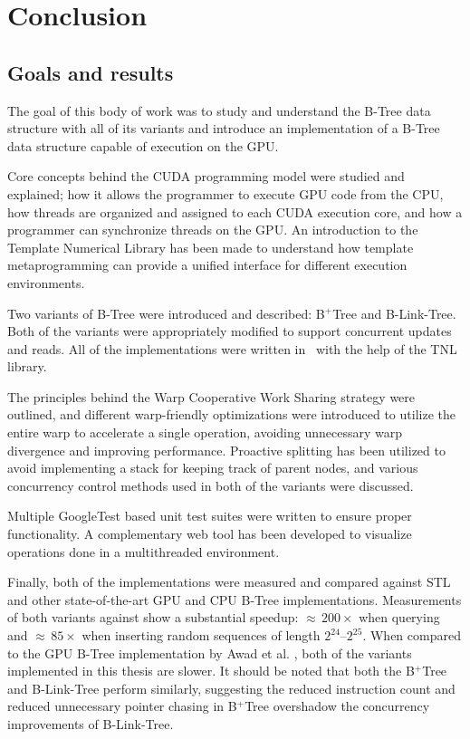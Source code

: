 \chapter{Conclusion}\label{chapter:conclusion}

\section{Goals and results}
The goal of this body of work was to study and understand the B-Tree data structure with all of its variants and introduce an implementation of a B-Tree data structure capable of execution on the GPU.

Core concepts behind the CUDA programming model were studied and explained; how it allows the programmer to execute GPU code from the CPU, how threads are organized and assigned to each CUDA execution core, and how a programmer can synchronize threads on the GPU. An introduction to the Template Numerical Library has been made to understand how template metaprogramming can provide a unified interface for different execution environments.

Two variants of B-Tree were introduced and described: B$^+$Tree and B-Link-Tree. Both of the variants were appropriately modified to support concurrent updates and reads. All of the implementations were written in \CC\ with the help of the TNL library.

The principles behind the Warp Cooperative Work Sharing strategy were outlined, and different warp-friendly optimizations were introduced to utilize the entire warp to accelerate a single operation, avoiding unnecessary warp divergence and improving performance. Proactive splitting has been utilized to avoid implementing a stack for keeping track of parent nodes, and various concurrency control methods used in both of the variants were discussed.

Multiple GoogleTest based unit test suites were written to ensure proper functionality. A complementary web tool has been developed to visualize operations done in a multithreaded environment.

Finally, both of the implementations were measured and compared against STL and other state-of-the-art GPU and CPU B-Tree implementations. Measurements of both variants against  show a substantial speedup: $\approx$\,$200\times$ when querying and $\approx$\,$85\times$ when inserting random sequences of length $2^{24}$--$2^{25}$. When compared to the GPU B-Tree implementation by Awad et al. \cite{awad}, both of the variants implemented in this thesis are slower. It should be noted that both the B$^+$Tree and B-Link-Tree perform similarly, suggesting the reduced instruction count and reduced unnecessary pointer chasing in B$^+$Tree overshadow the concurrency improvements of B-Link-Tree.

